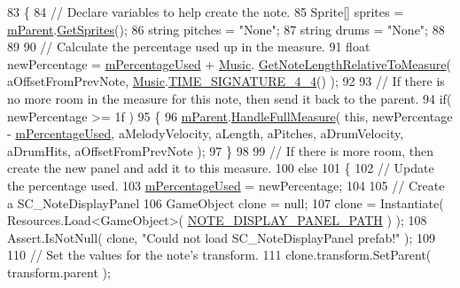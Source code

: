 \begin{DoxyCode}
83     \{
84         \textcolor{comment}{// Declare variables to help create the note.}
85         Sprite[] sprites = \hyperlink{group___s_c___m_d_p_priv_var_ga6f22ae359dd68605a8b2fd961ced96b5}{mParent}.\hyperlink{group___s_c___n_d_c_pub_func_ga3cdbb1068cd6511112c564fc636c56ca}{GetSprites}();
86         \textcolor{keywordtype}{string} pitches = \textcolor{stringliteral}{"None"};
87         \textcolor{keywordtype}{string} drums = \textcolor{stringliteral}{"None"};
88 
89 
90         \textcolor{comment}{// Calculate the percentage used up in the measure.}
91         \textcolor{keywordtype}{float} newPercentage = \hyperlink{group___s_c___m_d_p_priv_var_ga7567e9001016a06d950b9d0cc9e1d905}{mPercentageUsed} + \hyperlink{class_music}{Music}.
      \hyperlink{group___music_stat_func_ga91e290b48ad2289493ba4421308abe49}{GetNoteLengthRelativeToMeasure}( aOffsetFromPrevNote, 
      \hyperlink{class_music}{Music}.\hyperlink{group___music_stat_func_gac95af323eef7511543c799154e1c29fd}{TIME\_SIGNATURE\_4\_4}() );
92 
93         \textcolor{comment}{// If there is no more room in the measure for this note, then send it back to the parent.}
94         \textcolor{keywordflow}{if}( newPercentage >= 1f )
95         \{
96             \hyperlink{group___s_c___m_d_p_priv_var_ga6f22ae359dd68605a8b2fd961ced96b5}{mParent}.\hyperlink{group___s_c___n_d_c_handlers_ga40c5a3b59608c559ab96ad0338c5e042}{HandleFullMeasure}( \textcolor{keyword}{this}, newPercentage - 
      \hyperlink{group___s_c___m_d_p_priv_var_ga7567e9001016a06d950b9d0cc9e1d905}{mPercentageUsed}, aMelodyVelocity, aLength, aPitches, aDrumVelocity, aDrumHits, 
      aOffsetFromPrevNote );
97         \}
98 
99         \textcolor{comment}{// If there is more room, then create the new panel and add it to this measure.}
100         \textcolor{keywordflow}{else}
101         \{
102             \textcolor{comment}{// Update the percentage used.}
103             \hyperlink{group___s_c___m_d_p_priv_var_ga7567e9001016a06d950b9d0cc9e1d905}{mPercentageUsed} = newPercentage;
104 
105             \textcolor{comment}{// Create a SC\_NoteDisplayPanel}
106             GameObject clone = null;
107             clone = Instantiate( Resources.Load<GameObject>( 
      \hyperlink{group___s_c___m_d_p_const_ga6eee69b23fe2146403f41e4e862a3df9}{NOTE\_DISPLAY\_PANEL\_PATH} ) );
108             Assert.IsNotNull( clone, \textcolor{stringliteral}{"Could not load SC\_NoteDisplayPanel prefab!"} );
109 
110             \textcolor{comment}{// Set the values for the note's transform.}
111             clone.transform.SetParent( transform.parent );

\end{DoxyCode}
